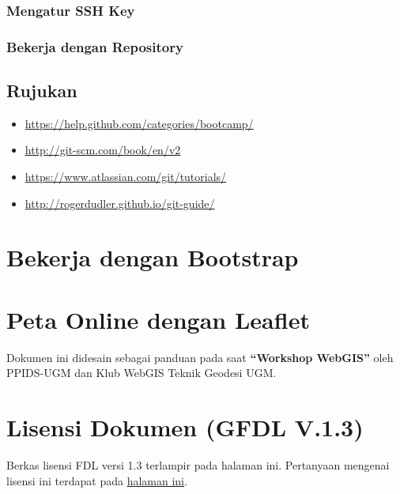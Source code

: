 \documentclass[letterpaper,10pt,english]{sphinxmanual}
\begin{document}
\subsubsection{Mengatur SSH Key}
\label{git:mengatur-ssh-key}

\subsubsection{Bekerja dengan Repository}
\label{git:bekerja-dengan-repository}

\subsection{Rujukan}
\label{git:rujukan}\label{git:ref-git}\begin{itemize}
\item {} 
\href{https://help.github.com/categories/bootcamp/}{https://help.github.com/categories/bootcamp/}

\item {} 
\href{http://git-scm.com/book/en/v2}{http://git-scm.com/book/en/v2}

\item {} 
\href{https://www.atlassian.com/git/tutorials/}{https://www.atlassian.com/git/tutorials/}

\item {} 
\href{http://rogerdudler.github.io/git-guide/}{http://rogerdudler.github.io/git-guide/}

\end{itemize}
\pagebreak[4]

\section{Bekerja dengan Bootstrap}
\label{bootstrap:bekerja-dengan-bootstrap}\label{bootstrap:bootstrap}\label{bootstrap::doc}\pagebreak[4]

\section{Peta Online dengan Leaflet}
\label{leaflet:leaflet}\label{leaflet::doc}\label{leaflet:peta-online-dengan-leaflet}
Dokumen ini didesain sebagai panduan pada saat \textbf{``Workshop WebGIS''}
oleh PPIDS-UGM dan Klub WebGIS Teknik Geodesi UGM.
\pagebreak[4]

\section{Lisensi Dokumen (GFDL V.1.3)}
\label{lisensi::doc}\label{lisensi:lisensi-dokumen-gfdl-v-1-3}
Berkas lisensi FDL versi 1.3 terlampir pada halaman ini. Pertanyaan mengenai
lisensi ini terdapat pada \href{http://www.gnu.org/copyleft/fdl.html}{halaman ini}.
\end{document}
